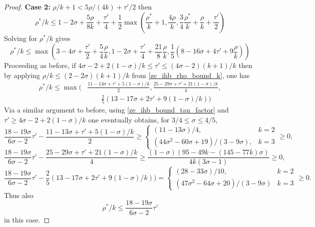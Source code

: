 \begin{proof}
\textbf{Case 2:} $\rho/k + 1 < 5\rho/(4k) + \tau'/2$ then 
\[
\rho^*/k \leq 1-2\sigma + \frac{5\rho}{8k} + \frac{\tau'}{4} + \frac{1}{2}\max(\frac{\rho^*}{k}+1, \frac{4\rho}{k}, \frac{3}{4}\frac{\rho^*}{k} + \frac{\rho}{k}+\frac{\tau'}{2})
\]
Solving for $\rho^*/k$ gives 
\[
\rho^*/k \le \max(3 - 4\sigma + \frac{\tau'}{2} + \frac{5}{4}\frac{\rho}{k}, 1 - 2\sigma + \frac{\tau'}{4} + \frac{21}{8}\frac{\rho}{k}, \frac{1}{5}(8 - 16\sigma + 4\tau' + 9\frac{\rho}{k}))
\]
Proceeding as before, if $4\sigma - 2 + 2(1 - \sigma)/k \le \tau' \le (4\sigma - 2)(k + 1)/k$ then by applying $\rho/k \le (2 - 2\sigma)(k + 1)/k$ from \eqref{ze_ihb_rho_bound_k}, one has
\begin{align*}
\rho^*/k \le \max(&\frac{11 - 13\sigma + \tau' + 5(1 - \sigma)/k}{2}, \frac{25 - 29\sigma + \tau' + 21(1-\sigma)/k}{4},\\
&\qquad\frac{2}{5}(13 - 17 \sigma + 2\tau' + 9 (1 - \sigma)/k))
\end{align*}
Via a similar argument to before, using \eqref{ze_ihb_bound_tau_factor} and $\tau' \ge 4\sigma - 2 + 2(1 - \sigma)/k$ one eventually obtains, for $3/4 \le \sigma \le 4/5$,
\[
\frac{18 - 19\sigma}{6\sigma - 2}\tau' - \frac{11 - 13\sigma + \tau' + 5(1 - \sigma)/k}{2} \ge \begin{cases}
(11 - 13\sigma)/4,&k = 2\\
(44\sigma^2 - 60\sigma + 19)/(3 - 9\sigma),&k=3
\end{cases}\ge 0,
\]
\[
\frac{18 - 19\sigma}{6\sigma - 2}\tau' - \frac{25 - 29\sigma + \tau' + 21(1-\sigma)/k}{4} \ge \frac{(1 - \sigma) (95 - 49 k - (145 - 77 k)\sigma)}{4 k (3\sigma - 1)} \ge 0,
\]
\[
\frac{18 - 19\sigma}{6\sigma - 2}\tau' - \frac{2}{5}(13 - 17 \sigma + 2\tau' + 9(1 - \sigma)/k)) = \begin{cases}
(28 - 33\sigma)/10,&k = 2\\
(47\sigma^2 - 64\sigma + 20)/(3 - 9\sigma)&k=3
\end{cases}\ge 0.
\]
Thus also 
\[
\rho^*/k \le \frac{18 - 19\sigma}{6\sigma - 2}\tau'
\]
in this case. 


\end{proof}

